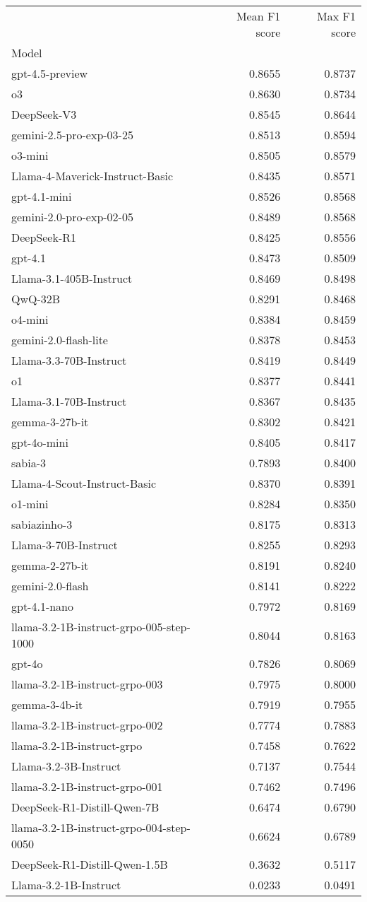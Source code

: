 \begin{tabular}{lrr}
\toprule
 & Mean F1 score & Max F1 score \\
Model &  &  \\
\midrule
gpt-4.5-preview & 0.8655 & 0.8737 \\
o3 & 0.8630 & 0.8734 \\
DeepSeek-V3 & 0.8545 & 0.8644 \\
gemini-2.5-pro-exp-03-25 & 0.8513 & 0.8594 \\
o3-mini & 0.8505 & 0.8579 \\
Llama-4-Maverick-Instruct-Basic & 0.8435 & 0.8571 \\
gpt-4.1-mini & 0.8526 & 0.8568 \\
gemini-2.0-pro-exp-02-05 & 0.8489 & 0.8568 \\
DeepSeek-R1 & 0.8425 & 0.8556 \\
gpt-4.1 & 0.8473 & 0.8509 \\
Llama-3.1-405B-Instruct & 0.8469 & 0.8498 \\
QwQ-32B & 0.8291 & 0.8468 \\
o4-mini & 0.8384 & 0.8459 \\
gemini-2.0-flash-lite & 0.8378 & 0.8453 \\
Llama-3.3-70B-Instruct & 0.8419 & 0.8449 \\
o1 & 0.8377 & 0.8441 \\
Llama-3.1-70B-Instruct & 0.8367 & 0.8435 \\
gemma-3-27b-it & 0.8302 & 0.8421 \\
gpt-4o-mini & 0.8405 & 0.8417 \\
sabia-3 & 0.7893 & 0.8400 \\
Llama-4-Scout-Instruct-Basic & 0.8370 & 0.8391 \\
o1-mini & 0.8284 & 0.8350 \\
sabiazinho-3 & 0.8175 & 0.8313 \\
Llama-3-70B-Instruct & 0.8255 & 0.8293 \\
gemma-2-27b-it & 0.8191 & 0.8240 \\
gemini-2.0-flash & 0.8141 & 0.8222 \\
gpt-4.1-nano & 0.7972 & 0.8169 \\
llama-3.2-1B-instruct-grpo-005-step-1000 & 0.8044 & 0.8163 \\
gpt-4o & 0.7826 & 0.8069 \\
llama-3.2-1B-instruct-grpo-003 & 0.7975 & 0.8000 \\
gemma-3-4b-it & 0.7919 & 0.7955 \\
llama-3.2-1B-instruct-grpo-002 & 0.7774 & 0.7883 \\
llama-3.2-1B-instruct-grpo & 0.7458 & 0.7622 \\
Llama-3.2-3B-Instruct & 0.7137 & 0.7544 \\
llama-3.2-1B-instruct-grpo-001 & 0.7462 & 0.7496 \\
DeepSeek-R1-Distill-Qwen-7B & 0.6474 & 0.6790 \\
llama-3.2-1B-instruct-grpo-004-step-0050 & 0.6624 & 0.6789 \\
DeepSeek-R1-Distill-Qwen-1.5B & 0.3632 & 0.5117 \\
Llama-3.2-1B-Instruct & 0.0233 & 0.0491 \\
\bottomrule
\end{tabular}
